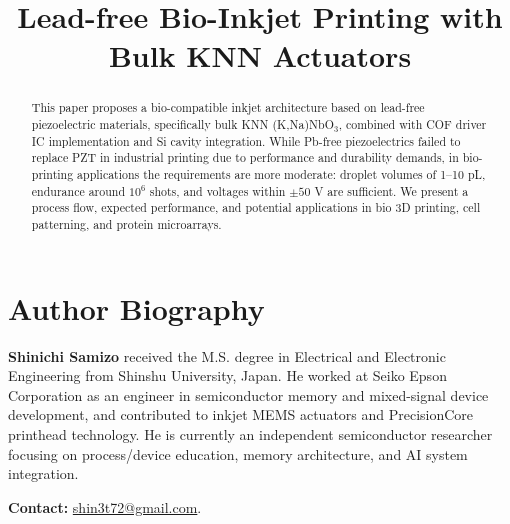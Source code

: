 \documentclass[conference]{IEEEtran}
\title{Lead-free Bio-Inkjet Printing with Bulk KNN Actuators}
\author{
  \IEEEauthorblockN{Shinichi Samizo}
  \IEEEauthorblockA{
    Independent Semiconductor Researcher\\
    Former Engineer at Seiko Epson Corporation\\
    Email: \href{mailto:shin3t72@gmail.com}{shin3t72@gmail.com}\\
    GitHub: \url{https://github.com/Samizo-AITL}
  }
}
\begin{document}
\maketitle

\begin{abstract}
This paper proposes a bio-compatible inkjet architecture based on
lead-free piezoelectric materials, specifically bulk KNN (K,Na)NbO$_3$,
combined with COF driver IC implementation and Si cavity integration.
While Pb-free piezoelectrics failed to replace PZT in industrial
printing due to performance and durability demands, in bio-printing
applications the requirements are more moderate: droplet volumes of
1--10 pL, endurance around $10^6$ shots, and voltages within $\pm50$ V
are sufficient. We present a process flow, expected performance, and
potential applications in bio 3D printing, cell patterning, and
protein microarrays.
\end{abstract}










\section*{Author Biography}
\textbf{Shinichi Samizo} received the M.S. degree in Electrical and Electronic Engineering 
from Shinshu University, Japan. He worked at Seiko Epson Corporation as an engineer in 
semiconductor memory and mixed-signal device development, and contributed to inkjet MEMS 
actuators and PrecisionCore printhead technology. He is currently an independent 
semiconductor researcher focusing on process/device education, memory architecture, and 
AI system integration. 

\textbf{Contact:} \href{mailto:shin3t72@gmail.com}{shin3t72@gmail.com}.
\end{document}
